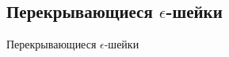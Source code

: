 \subsection{\texorpdfstring{Перекрывающиеся $\epsilon$-шейки}{Перекрывающиеся ϵ-шейки}}
Перекрывающиеся $\epsilon$-шейки